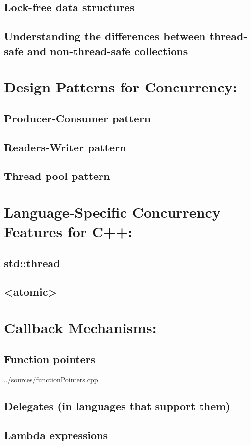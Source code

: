 \documentclass{article}
\begin{document}
\subsection{ Lock-free data structures}
\subsection{ Understanding the differences between thread-safe and non-thread-safe collections}
\section{Design Patterns for Concurrency:}
\subsection{ Producer-Consumer pattern}
\subsection{ Readers-Writer pattern}
\subsection{ Thread pool pattern}
\section{Language-Specific Concurrency Features for C++:}
\subsection{ std::thread}
\subsection{ <atomic>}
\section{Callback Mechanisms:}
\subsection{ Function pointers}
 {../sources/functionPointers.cpp}
\subsection{ Delegates (in languages that support them)}
\subsection{ Lambda expressions}
\end{document}
